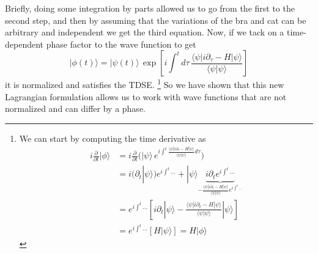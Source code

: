 Briefly, doing some integration by parts allowed us to go from the first to the second step, and then by assuming that the variations of the bra and cat can be arbitrary and independent we get the third equation. 
Now, if we tack on a time-dependent phase factor to the wave function to get
\begin{equation}
    |\phi(t)\rangle = |\psi(t)\rangle \, \exp\left[i \int^t d\tau \, 
\frac{\langle \psi | i \partial_\tau - H | \psi \rangle}{\langle \psi | \psi \rangle} \right]
\end{equation}
it is normalized and satisfies the TDSE.
\footnote{We can start by computing the time derivative as
\begin{align}
i \frac{\partial}{\partial t} |\phi\rangle 
&= i \frac{\partial}{\partial t} \Big( |\psi\rangle \, e^{i \int^t \frac{\langle \psi | i \partial_\tau - H | \psi \rangle}{\langle \psi | \psi \rangle} d\tau} \Big) \\
&= i (\partial_t |\psi\rangle) e^{i \int^t \dots} 
   + |\psi\rangle \underbrace{i \partial_t e^{i \int^t \dots}}_{- \frac{\langle \psi | i \partial_t - H | \psi \rangle}{\langle \psi | \psi \rangle} e^{i \int^t \dots}} \\
&= e^{i \int^t \dots} \left[ i \partial_t |\psi\rangle - \frac{\langle \psi | i \partial_t - H | \psi \rangle}{\langle \psi | \psi \rangle} |\psi\rangle \right] \\
&= e^{i \int^t \dots} \left[ H |\psi\rangle \right] = H |\phi\rangle
\end{align}
}
 So we have shown that this new Lagrangian formulation allows us to work with wave functions that are not normalized and can differ by a phase.


